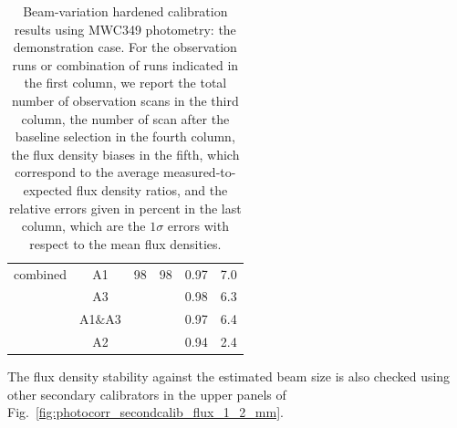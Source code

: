 \begin{table}[th]
\begin{center}
\begin{tabular}{|c|c|cccc|}
 \hline
combined & A1        &  98                & 98         &  0.97              &  7.0  \\ 
         & A3        &                    &            &  0.98              &  6.3  \\ 
         & A1$\&$A3  &                    &            &  0.97              &  6.4   \\ 
         & A2        &                    &            &  0.94              &  2.4  \\
\hline\hline
\end{tabular}
\caption[Beam-variation hardened calibration results using MWC349: the
demonstration case]{Beam-variation hardened calibration results using
  MWC349 photometry: the demonstration case. For the observation runs or combination of runs indicated in the first column, we report the total number of observation scans in the third column, the number of scan after the baseline selection in the fourth column, the flux density biases in the fifth, which correspond to the average measured-to-expected flux density ratios, and the relative errors given in percent in the last column, which are the $1\sigma$ errors with respect to the mean flux densities.}
\label{tab:photocorr_demo_calib_result_mwc349}
\end{center}
\end{table}


The flux density stability against the estimated beam size is also
checked using other secondary calibrators in the upper panels of
Fig.~\ref{fig:photocorr_secondcalib_flux_1_2_mm}.


